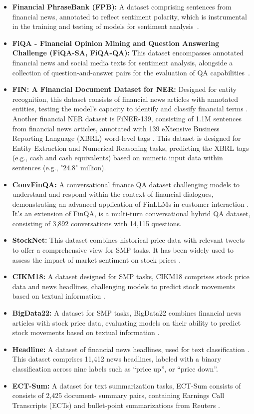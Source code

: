 \begin{itemize}
	\item \textbf{Financial PhraseBank (FPB):} A dataset comprising sentences from financial news, annotated to reflect sentiment polarity, which is instrumental in the training and testing of models for sentiment analysis~\cite{malo2014good}.
	\item \textbf{FiQA - Financial Opinion Mining and Question Answering Challenge (FiQA-SA, FiQA-QA):} This dataset encompasses annotated financial news and social media texts for sentiment analysis, alongside a collection of question-and-answer pairs for the evaluation of QA capabilities~\cite{maia2018www}.
	\item \textbf{FIN: A Financial Document Dataset for NER:} {Designed for entity recognition, this dataset consists of financial news articles with annotated entities, testing the model's capacity to identify and classify financial terms \textcite{alvarado2015domain}.
		      Another financial NER dataset is FiNER-139, consisting of 1.1M sentences from financial news articles, annotated with 139 eXtensive Business Reporting Language (XBRL) word-level tags \cite{loukas2022finer}. This dataset is designed for Entity Extraction and Numerical Reasoning tasks, predicting the XBRL tags (e.g., cash and cash equivalents) based on numeric input data within sentences (e.g., "24.8" million).}
	\item \textbf{ConvFinQA:} {A conversational finance QA dataset challenging models to understand and respond within the context of financial dialogues, demonstrating an advanced application of FinLLMs in customer interaction \textcite{chen2022convfinqa}. It's an extension of FinQA, is a multi-turn conversational hybrid QA dataset, consisting of 3,892 conversations with 14,115 questions.}
	\item \textbf{StockNet:} {This dataset combines historical price data with relevant tweets to offer a comprehensive view for SMP tasks. It has been widely used to assess the impact of market sentiment on stock prices \cite{xu2018stock}.}
	\item \textbf{CIKM18:} {A dataset designed for SMP tasks, CIKM18 comprises stock price data and news headlines, challenging models to predict stock movements based on textual information \cite{wu2018hybrid}.}
	\item \textbf{BigData22:} {A dataset for SMP tasks, BigData22 combines financial news articles with stock price data, evaluating models on their ability to predict stock movements based on textual information \textcite{soun2022accurate}.}
	\item \textbf{Headline:} {A dataset of financial news headlines, used for text classification \cite{sinha2021impact}. This dataset comprises 11,412 news headlines, labeled with a binary classification across nine labels such as “price up”, or “price down”.}
	\item \textbf{ECT-Sum:} {A dataset for text summarization tasks, ECT-Sum consists of consists of 2,425 document- summary pairs, containing Earnings Call Transcripts (ECTs) and bullet-point summarizations from Reuters \cite{mukherjee2022ectsum}.}
\end{itemize}

